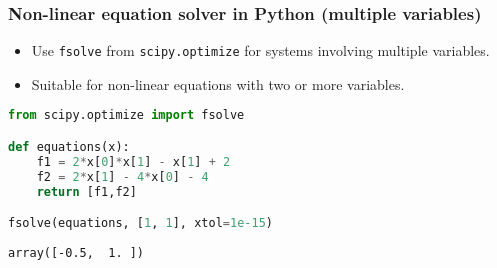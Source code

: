 \begin{frame}[fragile]
  \frametitle{Non-linear equation solver in Python (multiple variables)}

  \begin{itemize}
      \item Use \lstinline|fsolve| from \lstinline|scipy.optimize| for systems involving multiple variables.
      \item Suitable for non-linear equations with two or more variables.
  \end{itemize}
  \begin{lstlisting}[language=Python]
from scipy.optimize import fsolve

def equations(x):
    f1 = 2*x[0]*x[1] - x[1] + 2
    f2 = 2*x[1] - 4*x[0] - 4
    return [f1,f2]

fsolve(equations, [1, 1], xtol=1e-15)
    \end{lstlisting}
  \begin{lstlisting}[style=PyOutput]
array([-0.5,  1. ])
  \end{lstlisting}
\end{frame}

